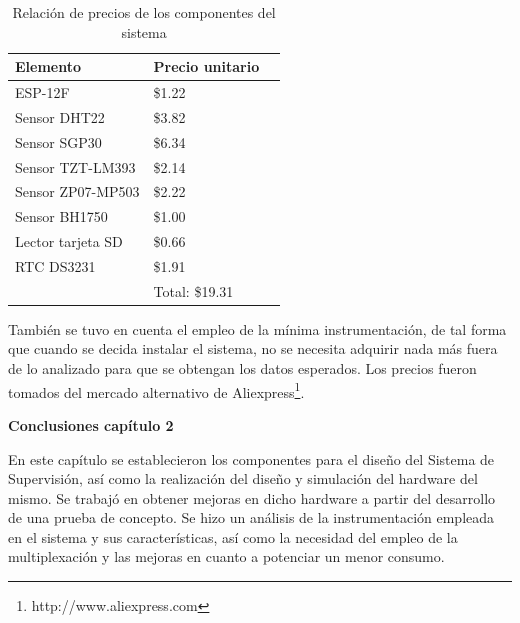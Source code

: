 \begin{table}[H]
    \centering
    \caption{Relación de precios de los componentes del sistema}
    \label{tab:precios_componentes}
    \begin{tabular}{|l|l|r|}
    \hline
    \cellcolor[HTML]{9698ED}Elemento    & \cellcolor[HTML]{9698ED}Precio unitario  \\ \hline
    ESP-12F                             & \$1.22                                   \\ \hline
    Sensor DHT22                        & \$3.82                                   \\ \hline
    Sensor SGP30                        & \$6.34                                   \\ \hline
    Sensor TZT-LM393                    & \$2.14                                   \\ \hline
    Sensor ZP07-MP503                   & \$2.22                                   \\ \hline
    Sensor BH1750                       & \$1.00                                   \\ \hline
    Lector tarjeta SD                   & \$0.66                                   \\ \hline
    RTC DS3231                          & \$1.91                                   \\ \hline
                                        & Total: \$19.31                           \\ \hline
    \end{tabular}
\end{table}

También se tuvo en cuenta el empleo de la mínima instrumentación, de tal forma que cuando se decida instalar el sistema, no se necesita adquirir nada más fuera de lo analizado para que se obtengan los datos esperados.
Los precios fueron tomados del mercado alternativo de Aliexpress\footnote{http://www.aliexpress.com}.\\

        \textbf{\Large Conclusiones capítulo 2}\vspace{0.5cm}

        En este capítulo se establecieron los componentes para el diseño del Sistema de Supervisión, así como la realización del diseño y simulación del hardware del mismo.
        Se trabajó en obtener mejoras en dicho hardware a partir del desarrollo de una prueba de concepto.
        Se hizo un análisis de la instrumentación empleada en el sistema y sus características, así como la necesidad del empleo de la multiplexación y las mejoras en cuanto a potenciar un menor consumo.
